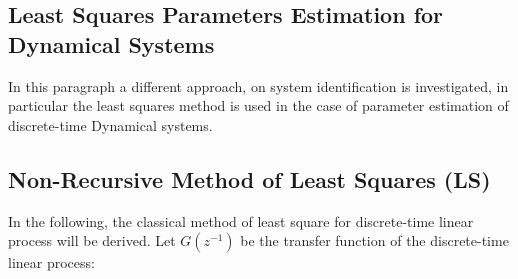 \documentclass[12pt,a4paper,oneside]{book}
\begin{document}
\begin{onehalfspace}
\chapter{Least Squares Parameters Estimation for Dynamical Systems}
In this paragraph a different approach, on system identification is 
investigated, in particular the least squares method is used in the case of 
parameter estimation of discrete-time Dynamical systems.

\section{Non-Recursive Method of Least Squares (LS)}
In the following, the classical method of least square for discrete-time linear 
process will be derived. 
Let $G(z^{-1})$ be the transfer function of the discrete-time linear process:


\end{onehalfspace}
\end{document}
